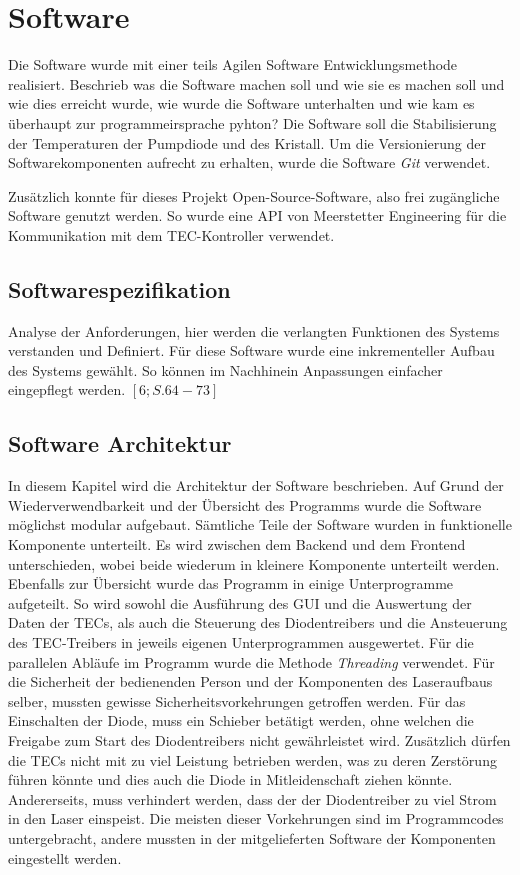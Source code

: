 \section{Software}
Die Software wurde mit einer teils Agilen Software Entwicklungsmethode realisiert. 
Beschrieb was die Software machen soll und wie sie es machen soll und wie dies erreicht wurde, wie wurde die Software unterhalten und wie kam es überhaupt zur programmeirsprache pyhton?
Die Software soll die Stabilisierung der Temperaturen der Pumpdiode und des Kristall.
Um die Versionierung der Softwarekomponenten aufrecht zu erhalten, wurde die Software \textit{Git} verwendet.

Zusätzlich konnte für dieses Projekt Open-Source-Software, also frei zugängliche Software genutzt werden. So wurde eine API von Meerstetter Engineering für die Kommunikation mit dem TEC-Kontroller verwendet.

\subsection{Softwarespezifikation}
Analyse der Anforderungen, hier werden die verlangten Funktionen des Systems verstanden und Definiert. Für diese Software wurde eine inkrementeller Aufbau des Systems gewählt. So können im Nachhinein Anpassungen einfacher eingepflegt werden. $[6; S. 64-73]$

\subsection{Software Architektur}
In diesem Kapitel wird die Architektur der Software beschrieben. Auf Grund der Wiederverwendbarkeit und der Übersicht des Programms wurde die Software möglichst modular aufgebaut. Sämtliche Teile der Software wurden in funktionelle Komponente unterteilt. Es wird zwischen dem Backend und dem Frontend unterschieden, wobei beide wiederum in kleinere Komponente unterteilt werden. Ebenfalls zur Übersicht wurde das Programm in einige Unterprogramme aufgeteilt. So wird sowohl die Ausführung des GUI und die Auswertung der Daten der TECs, als auch die Steuerung des Diodentreibers und die Ansteuerung des TEC-Treibers in jeweils eigenen Unterprogrammen ausgewertet. Für die parallelen Abläufe im Programm wurde die Methode \textit{Threading} verwendet.
Für die Sicherheit der bedienenden Person und der Komponenten des Laseraufbaus selber, mussten gewisse Sicherheitsvorkehrungen getroffen werden. Für das Einschalten der Diode, muss ein Schieber betätigt werden, ohne welchen die Freigabe zum Start des Diodentreibers nicht gewährleistet wird. Zusätzlich dürfen die TECs nicht mit zu viel Leistung betrieben werden, was zu deren Zerstörung führen könnte und dies auch die Diode in Mitleidenschaft ziehen könnte. Andererseits, muss verhindert werden, dass der der Diodentreiber zu viel Strom in den Laser einspeist. Die meisten dieser Vorkehrungen sind im Programmcodes untergebracht, andere mussten in der mitgelieferten Software der Komponenten eingestellt werden.

